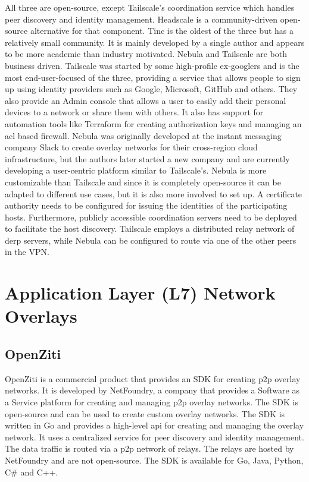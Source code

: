 All three are open-source, except Tailscale's coordination service which
handles peer discovery and identity management. Headscale
\autocite{fontJuanfontHeadscale2022} is a community-driven open-source
alternative for that component. Tinc is the oldest of the three but has
a relatively small community. It is mainly developed by a single author
and appears to be more academic than industry motivated. Nebula and
Tailscale are both business driven. Tailscale was started by some
high-profile ex-googlers and is the most end-user-focused of the three,
providing a service that allows people to sign up using identity
providers such as Google, Microsoft, GitHub and others. They also
provide an Admin console that allows a user to easily add their personal
devices to a network or share them with others. It also has support for
automation tools like Terraform for creating authorization keys and
managing an \gls{acl} based firewall. Nebula was originally developed at
the instant messaging company Slack to create overlay networks for their
cross-region cloud infrastructure, but the authors later started a new
company and are currently developing a user-centric platform similar to
Tailscale's. Nebula is more customizable than Tailscale and since it is
completely open-source it can be adapted to different use cases, but it
is also more involved to set up. A certificate authority needs to be
configured for issuing the identities of the participating hosts.
Furthermore, publicly accessible coordination servers need to be
deployed to facilitate the host discovery. Tailscale employs a
distributed relay network of \gls{derp} servers, while Nebula can be
configured to route via one of the other peers in the VPN.

\hypertarget{application-layer-l7-network-overlays}{%
\section{Application Layer (L7) Network
Overlays}\label{application-layer-l7-network-overlays}}

\hypertarget{openziti}{%
\subsection{OpenZiti}\label{openziti}}

OpenZiti is a commercial product that provides an SDK for creating
\gls{p2p} overlay networks. It is developed by NetFoundry, a company
that provides a Software as a Service platform for creating and managing
\gls{p2p} overlay networks. The SDK is open-source and can be used to
create custom overlay networks. The SDK is written in Go and provides a
high-level \gls{api} for creating and managing the overlay network. It
uses a centralized service for peer discovery and identity management.
The data traffic is routed via a \gls{p2p} network of relays. The relays
are hosted by NetFoundry and are not open-source. The SDK is available
for Go, Java, Python, C\# and C++.

